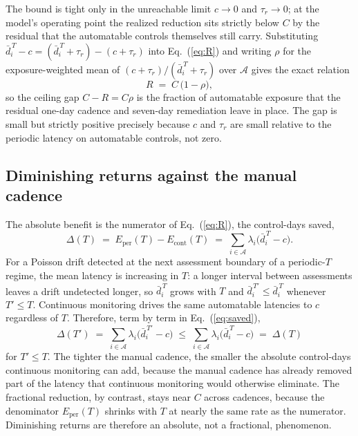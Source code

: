 \documentclass[journal]{IEEEtran}
\begin{document}
The bound is tight only in the unreachable limit $c \to 0$ and $\tau_r \to 0$; at the model's
operating point the realized reduction sits strictly below $C$ by the residual that the automatable
controls themselves still carry. Substituting $\bar d_i^{\,T} - c = (\bar d_i^{\,T} + \tau_r) - (c +
\tau_r)$ into Eq.~(\ref{eq:R}) and writing $\rho$ for the exposure-weighted mean of $(c + \tau_r) /
(\bar d_i^{\,T} + \tau_r)$ over $\mathcal{A}$ gives the exact relation
\begin{equation}
\label{eq:gap}
R \;=\; C \,\big( 1 - \rho \big) ,
\end{equation}
so the ceiling gap $C - R = C\rho$ is the fraction of automatable exposure that the residual one-day
cadence and seven-day remediation leave in place. The gap is small but strictly positive precisely
because $c$ and $\tau_r$ are small relative to the periodic latency on automatable controls, not zero.

\subsection{Diminishing returns against the manual cadence}
The absolute benefit is the numerator of Eq.~(\ref{eq:R}), the control-days saved,
\begin{equation}
\label{eq:saved}
\Delta(T) \;=\; E_{\text{per}}(T) - E_{\text{cont}}(T) \;=\; \sum_{i \in \mathcal{A}} \lambda_i \big( \bar d_i^{\,T} - c \big).
\end{equation}
For a Poisson drift detected at the next assessment boundary of a periodic-$T$ regime, the mean
latency is increasing in $T$: a longer interval between assessments leaves a drift undetected
longer, so $\bar d_i^{\,T}$ grows with $T$ and $\bar d_i^{\,T'} \le \bar d_i^{\,T}$ whenever $T' \le
T$. Continuous monitoring drives the same automatable latencies to $c$ regardless of $T$.
Therefore, term by term in Eq.~(\ref{eq:saved}),
\begin{equation}
\label{eq:dimret}
\Delta(T') \;=\; \sum_{i \in \mathcal{A}} \lambda_i \big( \bar d_i^{\,T'} - c \big) \;\le\; \sum_{i \in \mathcal{A}} \lambda_i \big( \bar d_i^{\,T} - c \big) \;=\; \Delta(T)
\end{equation}
for $T' \le T$. The tighter the manual cadence, the smaller the absolute control-days continuous
monitoring can add, because the manual cadence has already removed part of the latency that
continuous monitoring would otherwise eliminate. The fractional reduction, by contrast, stays near
$C$ across cadences, because the denominator $E_{\text{per}}(T)$ shrinks with $T$ at nearly the same
rate as the numerator. Diminishing returns are therefore an absolute, not a fractional, phenomenon.
\end{document}
